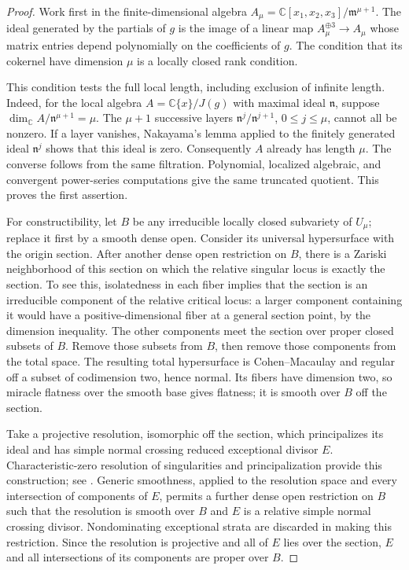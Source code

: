 \begin{proof}
Work first in the finite-dimensional algebra
$A_\mu=\mathbb C[x_1,x_2,x_3]/\mathfrak m^{\mu+1}$.  The ideal generated
by the partials of $g$ is the image of a linear map
$A_\mu^{\oplus3}\to A_\mu$ whose matrix entries depend polynomially on
the coefficients of $g$.  The condition that its cokernel have
dimension $\mu$ is a locally closed rank condition.

This condition tests the full local length, including exclusion of
infinite length.  Indeed, for the local algebra
$A=\mathbb C\{x\}/J(g)$ with maximal ideal $\mathfrak n$, suppose
$\dim_{\mathbb C}A/\mathfrak n^{\mu+1}=\mu$.  The $\mu+1$ successive
layers $\mathfrak n^j/\mathfrak n^{j+1}$, $0\leq j\leq\mu$, cannot
all be nonzero.  If a layer vanishes, Nakayama's lemma applied to the
finitely generated ideal $\mathfrak n^j$ shows that this ideal is zero.
Consequently $A$ already has length $\mu$.  The converse follows from
the same filtration.  Polynomial, localized algebraic, and convergent
power-series computations give the same truncated quotient.  This
proves the first assertion.

For constructibility, let $B$ be any irreducible locally closed
subvariety of $U_\mu$; replace it first by a smooth dense open.
Consider its universal hypersurface with the origin section.  After
another dense open restriction on $B$, there is a Zariski neighborhood
of this section on which the relative singular locus is exactly the
section.  To see this, isolatedness in each fiber implies that the
section is an irreducible component of the relative critical locus:
a larger component containing it would have a positive-dimensional
fiber at a general section point, by the dimension inequality.
The other components meet the section over proper closed subsets of
$B$.  Remove those subsets from $B$, then remove those components
from the total space.  The resulting total hypersurface is
Cohen--Macaulay and regular off a subset of codimension two, hence
normal.  Its fibers have dimension two, so miracle flatness over the
smooth base gives flatness; it is smooth over $B$ off the section.

Take a projective resolution, isomorphic off the section, which
principalizes its ideal and has simple normal crossing reduced
exceptional divisor $E$.  Characteristic-zero resolution of
singularities and principalization provide this construction; see
\cite[Theorems~1.0.1--1.0.3]{Wlodarczyk2005}.
Generic smoothness, applied to the resolution space and every
intersection of components of $E$, permits a further dense open
restriction on $B$ such that the resolution is smooth over $B$ and
$E$ is a relative simple normal crossing divisor.  Nondominating
exceptional strata are discarded in making this restriction.
Since the resolution is projective and all of $E$ lies over the
section, $E$ and all intersections of its components are proper over
$B$.


\end{proof}
